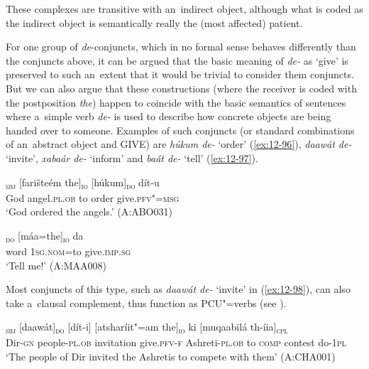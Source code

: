 These complexes are transitive with an~indirect object, although what is coded as the indirect object is semantically really the (most affected) patient. 


 For one group of \textit{de}-conjuncts, which in no formal sense behaves differently than the conjuncts above, it can be argued that the basic meaning of \textit{de-} as `give' is preserved to such an~extent that it would be trivial to consider them conjuncts. But we can also argue that these constructions (where the receiver is coded with the postposition \textit{the}) happen to coincide with the basic semantics of sentences where a~simple verb \textit{de-} is used to describe how concrete objects are being handed over to someone. Examples of such conjuncts (or standard combinations of an~abstract object and GIVE) are \textit{húkum de-} `order' (\ref{ex:12-96}), \textit{daawát de-} `invite', \textit{xabaár de-} `inform' and \textit{baát de-} `tell' (\ref{ex:12-97}).

\begin{exe}
\ex
\label{ex:12-96}
\gll [alaahtaalaá]\textsubscript{\textsc{sbj}} [farišteém the]\textsubscript{\textsc{io}} [húkum]\textsubscript{\textsc{do}} dít-u \\
God angel.\textsc{pl.ob} to order  give.\textsc{pfv"=msg} \\
\glt `God ordered the angels.' (A:ABO031)
\end{exe}
\begin{exe}
\ex
\label{ex:12-97}
\gll [baát]\textsubscript{\textsc{do}} [máa=the]\textsubscript{\textsc{io}} da  \\
word \textsc{1sg.nom=}to give.\textsc{imp.sg} \\
\glt `Tell me!' (A:MAA008)
\end{exe}

Most conjuncts of this type, such as \textit{daawát de-} `invite' in (\ref{ex:12-98}), can also take a~clausal complement, thus function as PCU"=verbs (see ).

\begin{exe}
\ex
\label{ex:12-98}
\gll [deeúl-ii xálak"=am]\textsubscript{\textsc{sbj}} [daawát]\textsubscript{\textsc{do}} [dít-i] [atsharíit"=am the]\textsubscript{\textsc{io}} ki [muqaabilá th-íia]\textsubscript{\textsc{cpl}}  \\
Dir-\textsc{gn} people-\textsc{pl.ob} invitation give.\textsc{pfv-f}  Ashreti-\textsc{pl.ob} to \textsc{comp} contest do-\textsc{1pl} \\
\glt `The people of Dir invited the Ashretis to compete with them' (A:CHA001)
\end{exe}

